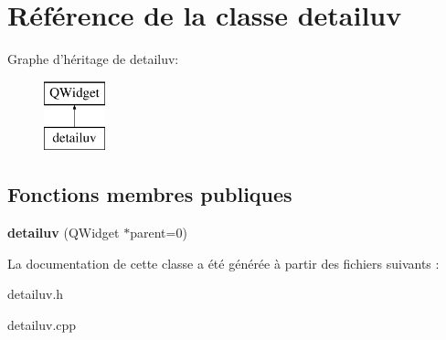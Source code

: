 \hypertarget{classdetailuv}{\section{Référence de la classe detailuv}
\label{classdetailuv}
}
Graphe d'héritage de detailuv\+:\begin{figure}[H]
\begin{center}
\leavevmode
\includegraphics[height=2.000000cm]{classdetailuv}
\end{center}
\end{figure}
\subsection*{Fonctions membres publiques}
\begin{DoxyCompactItemize}
\item 
\hypertarget{classdetailuv_a043d04e316874b6403266262ce295126}{{\bfseries detailuv} (Q\+Widget $\ast$parent=0)}\label{classdetailuv_a043d04e316874b6403266262ce295126}

\end{DoxyCompactItemize}


La documentation de cette classe a été générée à partir des fichiers suivants \+:\begin{DoxyCompactItemize}
\item 
detailuv.\+h\item 
detailuv.\+cpp\end{DoxyCompactItemize}
